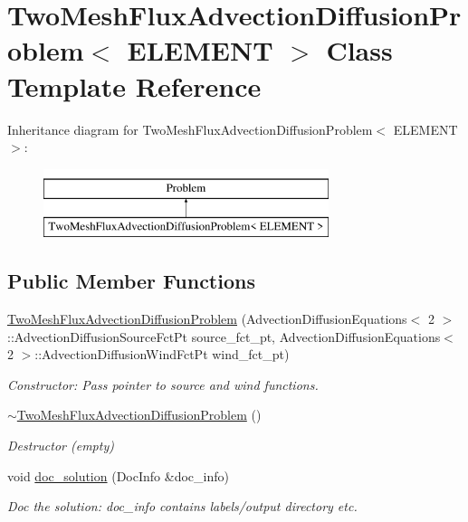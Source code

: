 \hypertarget{classTwoMeshFluxAdvectionDiffusionProblem}{}\section{Two\+Mesh\+Flux\+Advection\+Diffusion\+Problem$<$ E\+L\+E\+M\+E\+NT $>$ Class Template Reference}
\label{classTwoMeshFluxAdvectionDiffusionProblem}
Inheritance diagram for Two\+Mesh\+Flux\+Advection\+Diffusion\+Problem$<$ E\+L\+E\+M\+E\+NT $>$\+:\begin{figure}[H]
\begin{center}
\leavevmode
\includegraphics[height=2.000000cm]{classTwoMeshFluxAdvectionDiffusionProblem}
\end{center}
\end{figure}
\subsection*{Public Member Functions}
\begin{DoxyCompactItemize}
\item 
\hyperlink{classTwoMeshFluxAdvectionDiffusionProblem_a7f3ec24317465521cb84212d1c2dc662}{Two\+Mesh\+Flux\+Advection\+Diffusion\+Problem} (Advection\+Diffusion\+Equations$<$ 2 $>$\+::Advection\+Diffusion\+Source\+Fct\+Pt source\+\_\+fct\+\_\+pt, Advection\+Diffusion\+Equations$<$ 2 $>$\+::Advection\+Diffusion\+Wind\+Fct\+Pt wind\+\_\+fct\+\_\+pt)
\begin{DoxyCompactList}\small\item\em Constructor\+: Pass pointer to source and wind functions. \end{DoxyCompactList}\item 
\hyperlink{classTwoMeshFluxAdvectionDiffusionProblem_a65445b9eb9c01680d8137d1fdba05626}{$\sim$\+Two\+Mesh\+Flux\+Advection\+Diffusion\+Problem} ()
\begin{DoxyCompactList}\small\item\em Destructor (empty) \end{DoxyCompactList}\item 
void \hyperlink{classTwoMeshFluxAdvectionDiffusionProblem_a53cc08148cdf2f548939b5d09236f023}{doc\+\_\+solution} (Doc\+Info \&doc\+\_\+info)
\begin{DoxyCompactList}\small\item\em Doc the solution\+: doc\+\_\+info contains labels/output directory etc. \end{DoxyCompactList}\end{DoxyCompactItemize}
